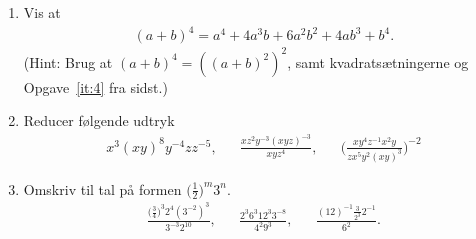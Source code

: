 \begin{enumerate}
\item Vis at 
\begin{align*}
(a+b)^4=a^4+4a^3b+6a^2b^2+4	ab^3+b^4.
\end{align*}
(Hint: Brug at $(a+b)^4=((a+b)^2)^{2}$, samt kvadratsætningerne og Opgave~\ref{it:4} fra sidst.)
\item Reducer følgende udtryk
\begin{align*}
x^3(xy)^8y^{-4}zz^{-5},&& \frac{xz^2y^{-3}(xyz)^{-3}}{xyz^4},&& \Big(\frac{xy^4z^{-1}x^2y}{zx^5y^{2}(xy)^3}\Big)^{-2}
\end{align*}
\item Omskriv til tal på formen $\Big(\frac{1}{2}\Big)^m 3^n$.
\begin{align*}
\frac{ \Big( \frac{3}{4}\Big)^{3}2^4(3^{-2})^{3}}{3^{-3}2^{10}},&& \frac{2^3 6^3 12^3 3^{-8}}{4^2 9^3},&& \frac{(12)^{-1}\frac{3}{2^3}2^{-1}}{6^2}.
\end{align*}


\end{enumerate}
